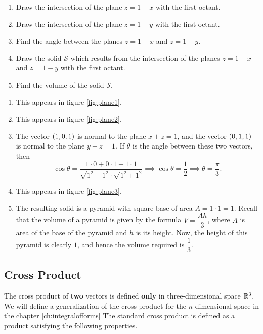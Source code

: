\begin{exa}\label{exa:2-inter-planes}
\noindent
\begin{enumerate}
\item Draw the intersection of the  plane  $z=1-x$ with the first
octant.
\item Draw the intersection of the  plane  $z=1-y$ with the first
octant.
\item Find the angle between the planes $z=1-x$ and
$z=1-y$.
\item Draw the solid $\mathcal{S}$ which results from the intersection of the  planes $z=1-x$ and  $z=1-y$ with the first
octant.
\item Find the volume of the solid $\mathcal{S}$.
\end{enumerate}
\end{exa}
\begin{solu}
\noindent
\begin{enumerate}
\item This appears in figure \ref{fig:plane1}.
\item This appears in figure \ref{fig:plane2}.
\item The vector $\left( 1, 0 , 1 \right)$ is normal to the plane $x+z=1$, and
the vector $\left( 0, 1 , 1 \right)$ is normal to the plane $y+z=1$. If
$\theta$  is the angle between these two vectors, then
$$\cos \theta = \dfrac{1\cdot 0 + 0 \cdot 1 + 1\cdot 1}{\sqrt{1^2+1^2} \cdot \sqrt{1^2+1^2}} \implies
\cos \theta = \dfrac{1}{2} \implies \theta = \dfrac{\pi}{3}. $$
\item This appears in figure \ref{fig:plane3}.
\item The resulting solid is a pyramid with square base of area $A=1\cdot 1
=1$. Recall that the volume of a pyramid is given by the formula
$V=\dfrac{Ah}{3}$, where $A$ is area of  the base of the pyramid and
$h$ is its height. Now, the height of this pyramid is clearly $1$,
and hence the volume required is $\dfrac{1}{3}$.
\end{enumerate}
\end{solu}


\subsection{Cross Product}

The cross product of \textbf{two} vectors is defined \textbf{only} in 
three-dimensional space
$\mathbb{R}^3$. We will define a generalization of the cross product for the $n$ 
dimensional space in the chapter \ref{ch:integralofforms}
The standard  cross product is defined as a product
satisfying the following properties.

